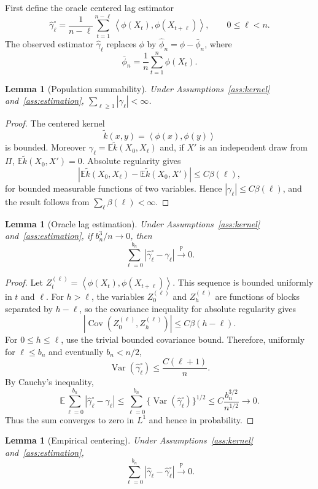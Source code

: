 \documentclass[11pt]{article}
\newtheorem{lemma}[theorem]{Lemma}
\newcommand{\E}{\mathbb{E}}
\newcommand{\Prob}{\mathbb{P}}
\newcommand{\1}{\mathbf{1}}
\newcommand{\inner}[2]{\left\langle #1, #2 \right\rangle}
\newcommand{\Cov}{\operatorname{Cov}}
\newcommand{\Var}{\operatorname{Var}}
\newcommand{\toP}{\xrightarrow{\Prob}}
\begin{document}
First define the oracle centered lag estimator
\[
\hat\gamma_\ell^\circ
=\frac{1}{n-\ell}\sum_{t=1}^{n-\ell}\inner{\phi(X_t)}{\phi(X_{t+\ell})},
\qquad 0\le\ell<n.
\]
The observed estimator $\hat\gamma_\ell$ replaces $\phi$ by $\hat\phi_n=\phi-\bar\phi_n$, where
\[
\bar\phi_n=\frac1n\sum_{t=1}^n\phi(X_t).
\]

\begin{lemma}[Population summability]
\label{lem:gamma-summability}
Under Assumptions~\ref{ass:kernel} and~\ref{ass:estimation}, $\sum_{\ell\ge1}|\gamma_\ell|<\infty$.
\end{lemma}

\begin{proof}
The centered kernel
\[
\widetilde k(x,y)=\inner{\phi(x)}{\phi(y)}
\]
is bounded. Moreover $\gamma_\ell=\E\widetilde k(X_0,X_\ell)$ and, if $X'$ is an independent draw from $\Pi$, $\E\widetilde k(X_0,X')=0$. Absolute regularity gives
\[
|\E\widetilde k(X_0,X_\ell)-\E\widetilde k(X_0,X')|
\le C\beta(\ell),
\]
for bounded measurable functions of two variables. Hence $|\gamma_\ell|\le C\beta(\ell)$, and the result follows from $\sum_\ell\beta(\ell)<\infty$.
\end{proof}

\begin{lemma}[Oracle lag estimation]
\label{lem:oracle-lags}
Under Assumptions~\ref{ass:kernel} and~\ref{ass:estimation}, if $b_n^3/n\to0$, then
\[
\sum_{\ell=0}^{b_n}|\hat\gamma_\ell^\circ-\gamma_\ell|\toP0.
\]
\end{lemma}

\begin{proof}
Let $Z_t^{(\ell)}=\inner{\phi(X_t)}{\phi(X_{t+\ell})}$. This sequence is bounded uniformly in $t$ and $\ell$. For $h>\ell$, the variables $Z_0^{(\ell)}$ and $Z_h^{(\ell)}$ are functions of blocks separated by $h-\ell$, so the covariance inequality for absolute regularity gives
\[
|\Cov(Z_0^{(\ell)},Z_h^{(\ell)})|\le C\beta(h-\ell).
\]
For $0\le h\le\ell$, use the trivial bounded covariance bound. Therefore, uniformly for $\ell\le b_n$ and eventually $b_n<n/2$,
\[
\Var(\hat\gamma_\ell^\circ)
\le \frac{C(\ell+1)}{n}.
\]
By Cauchy's inequality,
\[
\E\sum_{\ell=0}^{b_n}|\hat\gamma_\ell^\circ-\gamma_\ell|
\le \sum_{\ell=0}^{b_n}\{\Var(\hat\gamma_\ell^\circ)\}^{1/2}
\le C\frac{b_n^{3/2}}{n^{1/2}}\to0.
\]
Thus the sum converges to zero in $L^1$ and hence in probability.
\end{proof}

\begin{lemma}[Empirical centering]
\label{lem:empirical-centering}
Under Assumptions~\ref{ass:kernel} and~\ref{ass:estimation},
\[
\sum_{\ell=0}^{b_n}|\hat\gamma_\ell-\hat\gamma_\ell^\circ|\toP0.
\]
\end{lemma}
\end{document}
